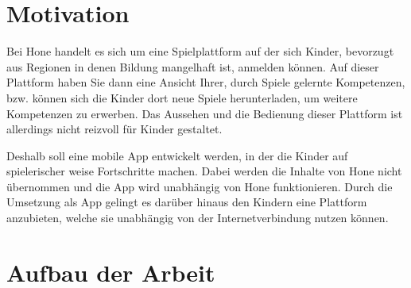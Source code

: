 \section{Motivation}
Bei Hone handelt es sich um eine Spielplattform auf der sich Kinder, bevorzugt aus Regionen in denen Bildung mangelhaft ist, anmelden können. Auf dieser Plattform haben Sie dann eine Ansicht Ihrer, durch Spiele gelernte Kompetenzen, bzw. können sich die Kinder dort neue Spiele herunterladen, um weitere Kompetenzen zu erwerben. Das Aussehen und die Bedienung dieser Plattform ist allerdings nicht reizvoll für Kinder gestaltet. 

Deshalb soll eine mobile App entwickelt werden, in der die Kinder auf spielerischer weise Fortschritte machen. Dabei werden die Inhalte von Hone nicht übernommen und die App wird unabhängig von Hone funktionieren. Durch die Umsetzung als App gelingt es darüber hinaus den Kindern eine Plattform anzubieten, welche sie unabhängig von der Internetverbindung nutzen können. 




\section{Aufbau der Arbeit}

